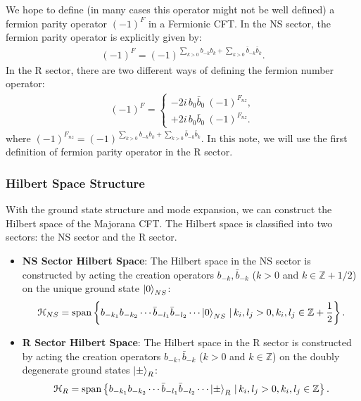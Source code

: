 We hope to define (in many cases this operator might not be well defined) a fermion parity operator $ (-1)^F $ in a Fermionic CFT. 
In the NS sector, the fermion parity operator is explicitly given by:
\begin{align}
  (-1)^F = (-1)^{\sum_{k>0} b_{-k} b_k + \sum_{k>0} \bar{b}_{-k} \bar{b}_k}.
\end{align}
In the R sector, there are two different ways of defining the fermion number operator:
\begin{align}
  (-1)^{F} =
\begin{cases}
  -2 i\, b_0 \bar b_0 \ (-1)^{F_{nz}},  \\
  +2 i\, b_0 \bar b_0 \ (-1)^{F_{nz}}. 
\end{cases}
\end{align}
where $ (-1)^{F_{nz}} = (-1)^{\sum_{k>0} b_{-k} b_k + \sum_{k>0} \bar{b}_{-k} \bar{b}_k} $. In this note, we will use the first definition of fermion parity operator in the R sector.

\subsubsection{Hilbert Space Structure}

With the ground state structure and mode expansion, we can construct the Hilbert space of the Majorana CFT. The Hilbert space is classified into two sectors: the NS sector and the R sector. 
\begin{itemize}
  \item \textbf{NS Sector Hilbert Space}:
        The Hilbert space in the NS sector is constructed by acting the creation operators $ b_{-k}, \bar{b}_{-k} $ ($ k > 0 $ and $ k \in \mathbb{Z} + 1/2 $) on the unique ground state $ \ket{0}_{NS} $:
        \begin{align}
          \mathcal{H}_{NS} = \mathrm{span}\left\{ b_{-k_1} b_{-k_2} \cdots \bar{b}_{-l_1} \bar{b}_{-l_2} \cdots \ket{0}_{NS} \,|\, k_i, l_j > 0, k_i, l_j \in \mathbb{Z} + \frac{1}{2} \right\}.
        \end{align}
      \item \textbf{R Sector Hilbert Space}: 
        The Hilbert space in the R sector is constructed by acting the creation operators $ b_{-k}, \bar{b}_{-k} $ ($ k > 0 $ and $ k \in \mathbb{Z} $) on the doubly degenerate ground states $ \ket{\pm}_{R} $:
        \begin{align}
          \mathcal{H}_{R} = \mathrm{span}\left\{ b_{-k_1} b_{-k_2} \cdots \bar{b}_{-l_1} \bar{b}_{-l_2} \cdots \ket{\pm}_{R} \,|\, k_i, l_j > 0, k_i, l_j \in \mathbb{Z}  \right\}.
        \end{align}
\end{itemize}



